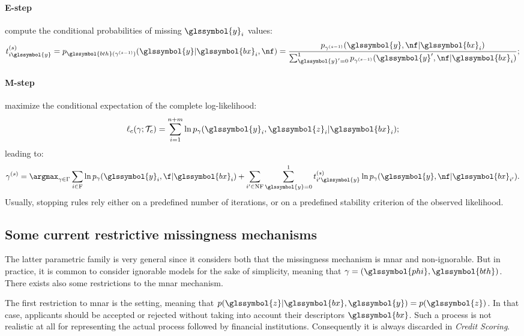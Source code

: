 \paragraph{E-step} compute the conditional probabilities of missing $\glssymbol{y}_i$ values:
\begin{equation}
t_{i\glssymbol{y}}^{(s)} = p_{\glssymbol{bth}(\gamma^{(s-1)})}(\glssymbol{y}|\glssymbol{bx}_i,\nf) = \frac{p_{\gamma^{(s-1)}}(\glssymbol{y}, \nf|\glssymbol{bx}_i)}{\sum_{\glssymbol{y}' = 0}^{1} p_{\gamma^{(s-1)}}(\glssymbol{y}', \nf|\glssymbol{bx}_i)};
\end{equation}
\paragraph{M-step} maximize the conditional expectation of the complete log-likelihood:
\begin{equation}\label{eq:like.c}
\ell_c(\gamma;\mathcal{T}_c) = \sum_{i=1}^{n+m}\ln p_{\gamma}(\glssymbol{y}_i,\glssymbol{z}_i | \glssymbol{bx}_i);
\end{equation}
leading to:
\begin{equation}
\gamma^{(s)} = \argmax_{\gamma \in \Gamma} \sum_{i\in \text{F}} \ln p_{\gamma}(\glssymbol{y}_i, \f|\glssymbol{bx}_i) +  \sum_{i'\in \text{NF}}\sum_{\glssymbol{y} = 0}^{1}t_{i'\glssymbol{y}}^{(s)} \ln p_{\gamma}(\glssymbol{y}, \nf | \glssymbol{bx}_{i'}).
\end{equation}
Usually, stopping rules rely either on a predefined number of iterations, or on a predefined stability criterion of the observed likelihood.

\subsection{Some current restrictive missingness mechanisms}
\label{sec:mechanisms}

The latter parametric family is very general since it considers both that the missingness mechanism is \gls{mnar} and non-ignorable. But in practice, it is common to consider ignorable models for the sake of simplicity, meaning that $\gamma= (\glssymbol{phi},\glssymbol{bth})$. There exists also some restrictions to the \gls{mnar} mechanism. 

The first restriction to \gls{mnar} is the  setting, meaning that $p(\glssymbol{z}| \glssymbol{bx},\glssymbol{y}) = p(\glssymbol{z})$. In that case, applicants should be accepted or rejected without taking into account their descriptors $\glssymbol{bx}$. Such a process is not realistic at all for representing the actual process followed by financial institutions. Consequently it is always discarded in \textit{Credit Scoring}.

